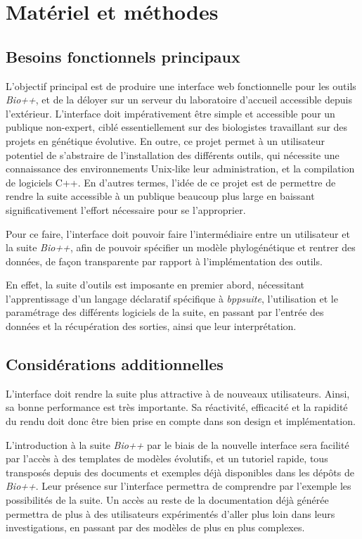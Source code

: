 \section{Matériel et méthodes}

\subsection{Besoins fonctionnels principaux}

L'objectif principal est de produire une interface web fonctionnelle pour les outils \textit{Bio++},
et de la déloyer sur un serveur du laboratoire d'accueil accessible depuis l'extérieur.
L'interface doit impérativement être simple et accessible pour un publique non-expert,
ciblé essentiellement sur des biologistes travaillant sur des projets en génétique évolutive.
En outre, ce projet permet à un utilisateur potentiel
de s'abstraire de l'installation des différents outils,
qui nécessite une connaissance des environnements Unix-like
leur administration, et la compilation de logiciels C++.
En d'autres termes, l'idée de ce projet
est de permettre de rendre la suite accessible
à un publique beaucoup plus large
en baissant significativement l'effort nécessaire
pour se l'approprier.

Pour ce faire, l'interface doit pouvoir faire l'intermédiaire entre un utilisateur
et la suite \textit{Bio++},
afin de pouvoir spécifier un modèle phylogénétique et rentrer des données,
de façon transparente par rapport à l'implémentation des outils.

En effet, la suite d'outils est imposante en premier abord,
nécessitant l'apprentissage d'un langage déclaratif spécifique à \textit{bppsuite},
l'utilisation et le paramétrage des différents logiciels de la suite,
en passant par l'entrée des données et la récupération des sorties,
ainsi que leur interprétation.


\subsection{Considérations additionnelles}

L'interface doit rendre la suite plus attractive à de nouveaux utilisateurs.
Ainsi, sa bonne performance est très importante.
Sa réactivité, efficacité et la rapidité du rendu
doit donc être bien prise en compte dans son design et implémentation.

L'introduction à la suite \textit{Bio++} par le biais de la nouvelle interface
sera facilité par l'accès à des templates de modèles évolutifs,
et un tutoriel rapide,
tous transposés depuis des documents et exemples
déjà disponibles dans les dépôts de \textit{Bio++}.
Leur présence sur l'interface permettra de comprendre par l'exemple
les possibilités de la suite.
Un accès au reste de la documentation déjà générée permettra de plus
à des utilisateurs expérimentés d'aller plus loin dans leurs investigations,
en passant par des modèles de plus en plus complexes.


